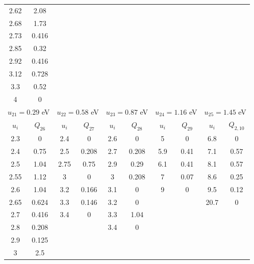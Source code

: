 \documentclass{report}
\begin{document}
\begin{table}
\begin{tabular}{|c|c||c|c||c|c||c|c||c|c|}
2.62 & 2.08   &       &       &      &       &      &       &      &       \\ 
2.68 & 1.73   &       &       &      &       &      &       &      &       \\ 
2.73 & 0.416  &       &       &      &       &      &       &      &       \\ 
2.85 & 0.32   &       &       &      &       &      &       &      &       \\ 
2.92 & 0.416  &       &       &      &       &      &       &      &       \\ 
3.12 & 0.728  &       &       &      &       &      &       &      &       \\ 
3.3  & 0.52   &       &       &      &       &      &       &      &       \\ 
4    & 0      &       &       &      &       &      &       &      &       \\ 
\multicolumn{2}{|c||}{$u_{21}=0.29$ eV} &
\multicolumn{2}{c||}{$u_{22}=0.58$ eV} &
\multicolumn{2}{c||}{$u_{23}=0.87$ eV} &
\multicolumn{2}{c||}{$u_{24}=1.16$ eV} &
\multicolumn{2}{c|}{$u_{25}=1.45$ eV}\\
\hline
\hline 
$u_i$ & $Q_{26}$ & $u_i$ & $Q_{27}$ & $u_i$ & $Q_{28}$ & $u_i$ & $Q_{29}$ & $u_i$ & $Q_{2,10}$ \\                                                                             
\hline
2.3  & 0      & 2.4   & 0     & 2.6   & 0     & 5    & 0    & 6.8  & 0     \\
2.4  & 0.75   & 2.5   & 0.208 & 2.7   & 0.208 & 5.9  & 0.41 & 7.1  & 0.57  \\
2.5  & 1.04   & 2.75  & 0.75  & 2.9   & 0.29  & 6.1  & 0.41 & 8.1  & 0.57  \\
2.55 & 1.12   & 3     & 0     & 3     & 0.208 & 7    & 0.07 & 8.6  & 0.25  \\
2.6  & 1.04   & 3.2   & 0.166 & 3.1   & 0     & 9    & 0    & 9.5  & 0.12  \\
2.65 & 0.624  & 3.3   & 0.146 & 3.2   & 0     &      &      & 20.7 & 0     \\
2.7  & 0.416  & 3.4   & 0     & 3.3   & 1.04  &      &      &      &       \\
2.8  & 0.208  &       &       & 3.4   & 0     &      &      &      &       \\
2.9  & 0.125  &       &       &       &       &      &      &      &       \\
3    & 2.5    &       &       &       &       &      &      &      &       \\

\end{tabular}
\end{table}
\end{document}
